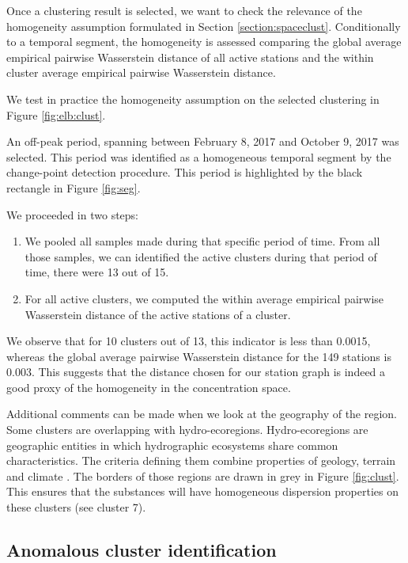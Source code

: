 Once a clustering result is selected, we want to check the relevance of the homogeneity assumption formulated in Section \ref{section:spaceclust}. Conditionally to a temporal segment, the homogeneity is assessed comparing the global average empirical pairwise Wasserstein distance of all active stations and the within cluster average empirical pairwise Wasserstein distance.    

We test in practice the homogeneity assumption on the selected clustering in Figure \ref{fig:elb:clust}. 

An off-peak period, spanning between February 8, 2017 and October 9, 2017 was selected. This period was identified as a homogeneous temporal segment by the change-point detection procedure.  This period is highlighted by the black rectangle in Figure \ref{fig:seg}.

We proceeded in two steps:
\begin{enumerate}
\item We pooled all samples made during that specific period of time. From all those samples, we can identified the active clusters during that period of time, there were 13 out of 15. 
\item For all active clusters, we computed the within average empirical pairwise Wasserstein distance of the active stations of a cluster. 
\end{enumerate}

We observe that for 10 clusters out of 13, this indicator is less than 0.0015, whereas the global average pairwise Wasserstein distance for the 149 stations is 0.003. This suggests that the distance chosen for our station graph is indeed a good proxy of the homogeneity in the concentration space. 

Additional comments can be made when we look at the geography of the region. Some clusters are overlapping with hydro-ecoregions. Hydro-ecoregions are geographic entities in which hydrographic ecosystems share common characteristics. The criteria defining them combine properties of geology, terrain and climate \cite{wasson:hal-02580774}. The borders of those regions are drawn in grey in Figure \ref{fig:clust}. This ensures that the substances will have homogeneous dispersion properties on these clusters (see cluster 7).

\subsection{Anomalous cluster identification}\label{subsection:anomalous}

